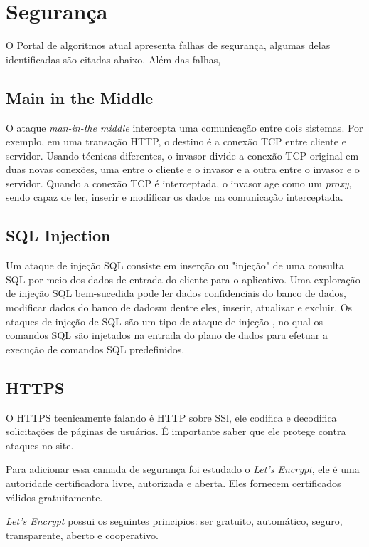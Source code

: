 \chapter{Seguran\c{c}a}\label{seguranca}

O Portal de algoritmos atual apresenta falhas de segurança, algumas delas identificadas são citadas abaixo. Além das falhas,

\section{Main in the Middle}

O ataque \textit{man-in-the middle} intercepta uma comunicação entre dois sistemas. Por exemplo, em uma transação \ac{HTTP}, o destino é a conexão \ac{TCP} entre cliente e servidor. Usando técnicas diferentes, o invasor divide a conexão \ac{TCP} original em duas novas conexões, uma entre o cliente e o invasor e a outra entre o invasor e o servidor. Quando a conexão \ac{TCP} é interceptada, o invasor age como um \textit{proxy}, sendo capaz de ler, inserir e modificar os dados na comunicação interceptada.\cite{OwaspMainInTheMiddle}

\section{SQL Injection}

Um ataque de injeção SQL consiste em inserção ou "injeção" de uma consulta SQL por meio dos dados de entrada do cliente para o aplicativo. Uma exploração de injeção SQL bem-sucedida pode ler dados confidenciais do banco de dados, modificar dados do banco de dadosm dentre eles, inserir, atualizar e excluir. Os ataques de injeção de SQL são um tipo de ataque de injeção , no qual os comandos SQL são injetados na entrada do plano de dados para efetuar a execução de comandos SQL predefinidos.\cite{OwaspSQLInjection}

\section{HTTPS}

O \ac{HTTPS} tecnicamente falando é \ac{HTTP} sobre \ac{SSl}, ele codifica e decodifica solicitações de páginas de usuários. É importante saber que ele protege contra ataques no site.

Para adicionar essa camada de segurança foi estudado o \textit{Let's Encrypt}, ele é uma autoridade certificadora livre, autorizada e aberta. Eles fornecem certificados válidos gratuitamente.\cite{LetsEncrypt}

\textit{Let's Encrypt} possui os seguintes principios: ser gratuito, automático, seguro, transparente, aberto e cooperativo.
